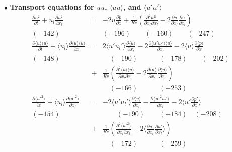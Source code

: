 \documentclass[a4paper,11pt]{article}
\begin{document}
\noindent $\bullet$  \textbf{Transport equations for $uu$, $\langle uu\rangle$, and $\langle u'u'\rangle$}
\begin{eqnarray}
\frac{\partial u^2 }{\partial t}
+u_l\frac{\partial u^2 }{\partial x_l}
&=&-2u\frac{\partial p }{\partial x}
+\frac{1}{Re}(\frac{\partial^2 u^2 }{\partial x_l\partial x_l}-2\frac{\partial u }{\partial x_l}\frac{\partial u }{\partial x_l}) \\
(-142) &&(-196) \quad{}  \quad{} (-160) \quad{} \quad{} (-247)\nonumber \\
\frac{\partial \langle u\rangle \langle u\rangle }{\partial t}
+\langle u_l\rangle \frac{\partial \langle u\rangle \langle u\rangle }{\partial x_l}
&=&2\langle u'u_l'\rangle \frac{\partial \langle u \rangle}{\partial x_l}
-2\frac{\partial \langle u'u_l'\rangle \langle u \rangle }{\partial x_l}
-2\langle u\rangle \frac{\partial \langle p\rangle }{\partial x}\nonumber \\
(-148) \quad{}&&\quad{} (-190) \quad{} \qquad{} (-178)  \quad{} \quad{} (-202)\nonumber \\
&+&\frac{1}{Re}(\frac{\partial^2 \langle u\rangle \langle u \rangle}{\partial x_l\partial x_l}-2\frac{\partial \langle u\rangle }{\partial x_l} \frac{\partial \langle u\rangle }{\partial x_l}) \\
&&\quad{}(-166) \quad{} \qquad{} (-253) \nonumber \\
\frac{\partial \langle u'^2\rangle }{\partial t}
+\langle u_l\rangle \frac{\partial \langle u'^2\rangle }{\partial x_l}
&=&-2\langle u'u_l'\rangle \frac{\partial \langle u \rangle  }{\partial x_l}
-\frac{\partial \langle u'^2u_l'\rangle}{\partial x_l} 
-2\langle u' \frac{\partial  p' }{\partial x}\rangle \nonumber \\
(-154)\quad{} &&\quad{}\quad{} (-190) \quad{} \quad{} (-184) \quad{} (-208) \nonumber \\
&+&\frac{1}{Re}(\frac{\partial^2 \langle u'^2 \rangle}{\partial x_l\partial x_l}-2\langle \frac{\partial  u' }{\partial x_l}\frac{\partial  u' }{\partial x_l}\rangle) \\
&&\quad{} (-172) \qquad{} \quad{}(-259) \nonumber
\end{eqnarray}
\end{document}
